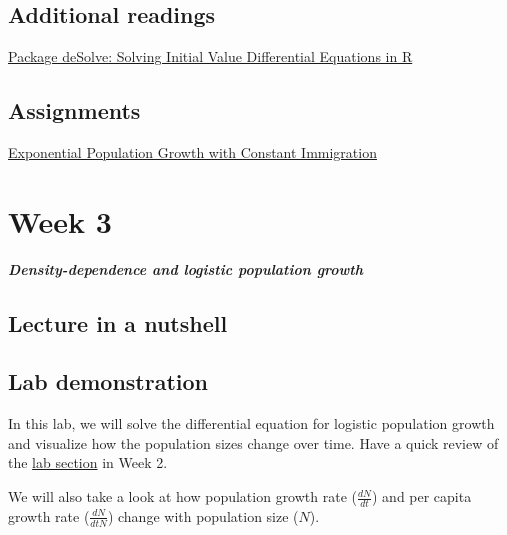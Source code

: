 \documentclass[
]{book}
\begin{document}
\hypertarget{additional-readings-1}{%
\section*{Additional readings}\label{additional-readings-1}}

\href{./Additional\%20readings/Package\%20deSolve\%20-\%20Solving\%20Initial\%20Value\%20Differential\%20Equations\%20in\%20R.pdf}{Package deSolve: Solving Initial Value Differential Equations in R}

\hypertarget{assignments-1}{%
\section*{Assignments}\label{assignments-1}}

\href{./Assignments/Week2_Exponential\%20Growth.pdf}{Exponential Population Growth with Constant Immigration}

\hypertarget{week-3}{%
\chapter*{Week 3}\label{week-3}}

\textbf{\emph{Density-dependence and logistic population growth}}

\hypertarget{lecture-in-a-nutshell-2}{%
\section*{Lecture in a nutshell}\label{lecture-in-a-nutshell-2}}

\hypertarget{lab-demonstration-2}{%
\section*{Lab demonstration}\label{lab-demonstration-2}}

In this lab, we will solve the differential equation for logistic population growth and visualize how the population sizes change over time. Have a quick review of the \href{https://genchanghsu.github.io/2021_Fall_Introduction_to_Theoretical_Ecology/week-2.html\#lab-demonstration-1}{lab section} in Week 2.

We will also take a look at how population growth rate (\(\frac{dN}{dt}\)) and per capita growth rate (\(\frac{dN}{dtN}\)) change with population size (\(N\)).
\end{document}

